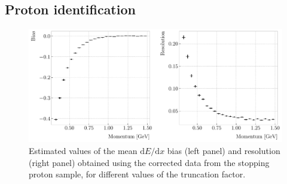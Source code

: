 \subsection{Proton identification}

\begin{figure}[t]
	\centering
	\includegraphics[width=.90\linewidth]{Images/GArSoft_PID/dEdx/proton_dEdx_momentum.pdf}
	\caption{Estimated values of the mean $\mathrm{d}E/\mathrm{d}x$ bias (left panel) and resolution (right panel) obtained using the corrected data from the stopping proton sample, for different values of the truncation factor.}
	\label{fig:proton_dEdx_momentum}
\end{figure}

